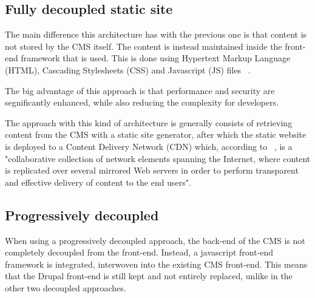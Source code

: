 \subsection{Fully decoupled static site}

The main difference this architecture has with the previous one is that content is not stored by the CMS itself. The content is instead maintained inside the front-end framework that is used. This is done using Hypertext Markup Language (HTML), Cascading Stylesheets (CSS) and Javascript (JS) files ~\autocite{Dropsolid2021}.

The big advantage of this approach is that performance and security are segnificantly enhanced, while also reducing the complexity for developers.

The approach with this kind of architecture is generally consists of retrieving content from the CMS with a static site generator, after which the static website is deployed to a Content Delivery Network (CDN) which, according to ~\textcite{Buyya2008}, is a "collaborative collection of network elements spanning the Internet, where content is replicated over
several mirrored Web servers in order to perform transparent and effective delivery of content to the end users".

\subsection{Progressively decoupled}

When using a progressively decoupled approach, the back-end of the CMS is not completely decoupled from the front-end. Instead, a javascript front-end framework is integrated, interwoven into the existing CMS front-end. This means that the Drupal front-end is still kept and not entirely replaced, unlike in the other two decoupled approaches. 

